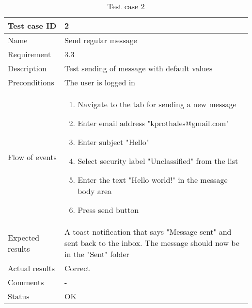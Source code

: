 		\begin{table}
			\begin{tabular}{l|p{10cm}}
				Test case ID & 2 \\ \hline
				Name & Send regular message\\ \hline
				Requirement & 3.3\\ \hline
				Description & Test sending of message with default values\\ \hline
				Preconditions & The user is logged in\\ \hline
				Flow of events & 
					\begin{enumerate}
						\item{}Navigate to the tab for sending a new message
						\item{}Enter email address "kprothales@gmail.com"
						\item{}Enter subject "Hello"
						\item{}Select security label "Unclassified" from the list
						\item{}Enter the text "Hello world!" in the message body area
						\item{}Press send button
					\end{enumerate} \\ \hline
				Expected results & A toast notification that says "Message sent" and sent back to the inbox. The message 						should now be in the "Sent" folder\\ \hline
				Actual results & Correct\\ \hline
				Comments & -\\ \hline
				Status & OK\\ \hline
			\end{tabular}
			\caption{Test case 2} \label{tab:case2}
		\end{table}

